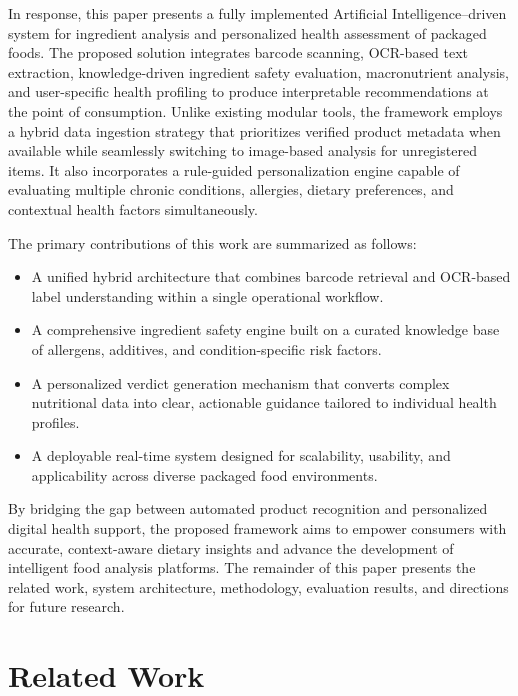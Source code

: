\documentclass[conference]{IEEEtran}
\begin{document}
In response, this paper presents a fully implemented Artificial Intelligence–driven system for ingredient analysis and personalized health assessment of packaged foods. The proposed solution integrates barcode scanning, OCR-based text extraction, knowledge-driven ingredient safety evaluation, macronutrient analysis, and user-specific health profiling to produce interpretable recommendations at the point of consumption. Unlike existing modular tools, the framework employs a hybrid data ingestion strategy that prioritizes verified product metadata when available while seamlessly switching to image-based analysis for unregistered items. It also incorporates a rule-guided personalization engine capable of evaluating multiple chronic conditions, allergies, dietary preferences, and contextual health factors simultaneously.

The primary contributions of this work are summarized as follows:

\begin{itemize}
    \item A unified hybrid architecture that combines barcode retrieval and OCR-based label understanding within a single operational workflow.
    \item A comprehensive ingredient safety engine built on a curated knowledge base of allergens, additives, and condition-specific risk factors.
    \item A personalized verdict generation mechanism that converts complex nutritional data into clear, actionable guidance tailored to individual health profiles.
    \item A deployable real-time system designed for scalability, usability, and applicability across diverse packaged food environments.
\end{itemize}

By bridging the gap between automated product recognition and personalized digital health support, the proposed framework aims to empower consumers with accurate, context-aware dietary insights and advance the development of intelligent food analysis platforms. The remainder of this paper presents the related work, system architecture, methodology, evaluation results, and directions for future research.

\section{Related Work}
\end{document}
